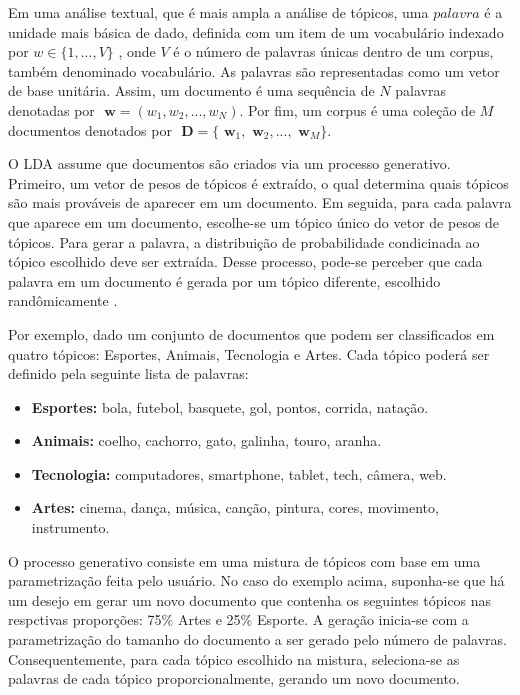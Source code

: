 \documentclass[12pt,a4paper]{article}
\begin{document}
Em uma análise textual, que é mais ampla a análise de  tópicos, uma $palavra$ é a unidade mais básica de dado, definida com um item de um vocabulário indexado por \(w \in \{1,. . . , V\}\)  , onde $V$ é o número de palavras únicas dentro de um corpus, também denominado vocabulário. As palavras são representadas como um vetor de base unitária. Assim, um documento é uma sequência de $N$ palavras denotadas por \(\textbf{ w} = (w_1, w_2,. . . ,  w_N)\). Por fim, um corpus é uma coleção de $M$ documentos denotados por \(\textbf{ D} = \{\textbf{ w}_1, \textbf{ w}_2, . . ., \textbf{ w}_M\}\).

 O LDA assume que documentos são criados via um processo generativo. Primeiro, um vetor de pesos de tópicos é extraído, o qual determina
 quais tópicos são mais prováveis de aparecer em um documento. Em seguida, para cada palavra que aparece em um documento, escolhe-se um tópico
 único do vetor de pesos de tópicos. Para gerar a palavra, a distribuição de probabilidade condicinada ao tópico escolhido deve ser extraída.
 Desse processo, pode-se perceber que cada palavra em um documento é gerada por um tópico diferente, escolhido randômicamente \cite{hu2009latent}.

 Por exemplo, dado um conjunto de documentos que podem ser classificados em quatro tópicos: Esportes, Animais, Tecnologia e Artes. 
 Cada tópico poderá ser definido pela seguinte lista de palavras:

\begin{itemize}
  \item \textbf{ Esportes:} bola, futebol, basquete, gol, pontos, corrida, natação.
  \item \textbf{ Animais:} coelho, cachorro, gato, galinha, touro, aranha.
  \item \textbf{ Tecnologia:} computadores, smartphone, tablet, tech, câmera, web.
  \item \textbf{ Artes:} cinema, dança, música, canção, pintura, cores, movimento, instrumento.
\end{itemize}

O processo generativo consiste em uma mistura de tópicos com base em uma parametrização feita pelo usuário. No caso do exemplo acima, suponha-se que há um desejo em gerar um novo documento que contenha os seguintes tópicos nas respctivas proporções: 75\% Artes e 25\% Esporte. A geração inicia-se com a parametrização do tamanho do documento a ser gerado pelo número de palavras. Consequentemente, para cada tópico escolhido na mistura, seleciona-se as palavras de cada tópico proporcionalmente, gerando um novo documento.
\end{document}
